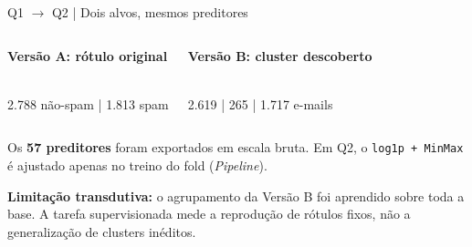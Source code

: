 \documentclass[aspectratio=169,11pt]{beamer}
\begin{document}
\begin{frame}[t]{Q1 $\rightarrow$ Q2 | Dois alvos, mesmos preditores}

\begin{columns}[T,onlytextwidth]
\begin{simplebox}
\textbf{Versão A: rótulo original}\par\smallskip
{}\\\small 2.788 não-spam | 1.813 spam
\end{simplebox}
\begin{simplebox}
\textbf{Versão B: cluster descoberto}\par\smallskip
{}\\\small 2.619 | 265 | 1.717 e-mails
\end{simplebox}
\end{columns}
\vspace{2mm}
\begin{notabox}\small Os \textbf{57 preditores} foram exportados em escala bruta. Em Q2, o \texttt{log1p + MinMax} é ajustado apenas no treino do fold (\textit{Pipeline}).\end{notabox}
\vspace{2mm}
\begin{alertabox}\scriptsize \textbf{Limitação transdutiva:} o agrupamento da Versão B foi aprendido sobre toda a base. A tarefa supervisionada mede a reprodução de rótulos fixos, não a generalização de clusters inéditos.\end{alertabox}

\end{frame}
\end{document}
